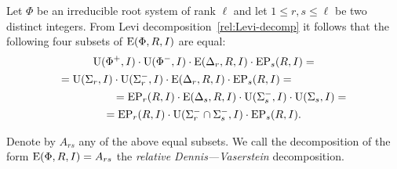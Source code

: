 Let $\Phi$ be an irreducible root system of rank $\ell$ and let $1\leq r,s \leq \ell$ be two distinct integers.
From Levi decomposition~\ref{rel:Levi-decomp} it follows that the following four subsets of $\operatorname{E}(\Phi, R, I)$ are equal:
\begin{multline*}
\operatorname{U}(\Phi^+, I)\cdot \operatorname{U}(\Phi^-, I) \cdot \operatorname{E}(\Delta_r, R, I) \cdot \operatorname{EP}_s(R, I) = \\
= \operatorname{U}(\Sigma_r, I)\cdot \operatorname{U}(\Sigma^-_r, I) \cdot \operatorname{E}(\Delta_r, R, I) \cdot \operatorname{EP}_s(R, I) = \hspace{5em} \\
\hspace{5em} = \operatorname{EP}_r(R, I) \cdot \operatorname{E}(\Delta_s, R, I) \cdot \operatorname{U}(\Sigma_s^-, I)\cdot \operatorname{U}(\Sigma_s, I) = \\
= \operatorname{EP}_r(R, I) \cdot \operatorname{U}(\Sigma^-_r\cap \Sigma^-_s, I) \cdot \operatorname{EP}_s(R, I).
\end{multline*}


\begin{dfn}
 Denote by $A_{rs}$ any of the above equal subsets.
 We call the decomposition of the form $\operatorname{E}(\Phi, R, I) = A_{rs}$ the {\it relative Dennis---Vaserstein} decomposition.
\end{dfn}


